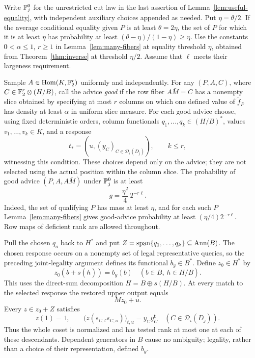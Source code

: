 Write $\mathbb P_j^0$ for the unrestricted cut law in the last assertion of
Lemma~\ref{lem:useful-equality}, with independent auxiliary choices appended
as needed.  Put $\eta=\theta/2$.  If the average conditional equality given $P$
is at least $\theta=2\eta$, the set of $P$ for which it is at least
$\eta$ has probability at least $(\theta-\eta)/(1-\eta)\ge\eta$.  Use the constants
$0<\alpha\le1$, $r\ge1$ in Lemma~\ref{lem:many-fibers} at equality threshold
$\eta$, obtained from Theorem~\ref{thm:inverse} at threshold $\eta/2$.
Assume that $\ell$ meets their largeness requirement.

Sample $A\in\operatorname{Hom}(K,\mathbb F_2^r)$ uniformly and independently.  For any
$(P,A,C)$, where $C\in\mathbb F_2^r\otimes(H/B)$, call the advice \emph{good} if
the row fiber $A\bar M=C$ has a nonempty slice obtained by specifying at
most $r$ columns on which one defined value of $\widetilde f_P$ has density
at least $\alpha$ in uniform slice measure.  For each good advice choose,
using fixed deterministic orders, column functionals
$q_1,\ldots,q_k\in(H/B)^*$, values $v_1,\ldots,v_k\in K$, and a response
\[
 t_*=(u,(y_C)_{C\in\mathcal D_i(D_j)}),\qquad k\le r,
\]
witnessing this condition.  These choices depend only on the advice; they
are not selected using the actual position within the column slice.
The probability of good advice $(P,A,A\bar M)$ under $\mathbb P_j^0$ is at least
\begin{equation}\label{eq:upper-g}
 g=\frac{\eta^2}{4}\,2^{-r\ell}.
\end{equation}
Indeed, the set of qualifying $P$ has mass at least $\eta$, and for each
such $P$ Lemma~\ref{lem:many-fibers} gives good-advice probability at least
$(\eta/4)2^{-r\ell}$.  Row maps of deficient rank are allowed throughout.

Pull the chosen $q_a$ back to $H^*$ and put
$Z=\operatorname{span}\{q_1,\ldots,q_k\}\subseteq\operatorname{Ann}(B)$.  The chosen response occurs
on a nonempty set of legal representative queries, so the preceding
joint-legality argument defines its functional $b_y\in B^*$.
Define $z_0\in H^*$ by
\begin{equation}\label{eq:upper-z0}
 z_0(b+s(\bar h))=b_y(b)
       \quad(b\in B,\ \bar h\in H/B).
\end{equation}
This uses the direct-sum decomposition $H=B\oplus s(H/B)$.  At every match
to the selected response the restored upper output equals
\begin{equation}\label{eq:upper-restored}
 Mz_0+u.
\end{equation}
Every $z\in z_0+Z$ satisfies
\begin{equation}\label{eq:upper-valid}
 z(1)=1,\qquad
 \bigl(z(s_{C,t}s_{C,u})\bigr)_{t,u}
       =y_Cy_C^{\mathsf t}\quad(C\in\mathcal D_i(D_j)).
\end{equation}
Thus the whole coset is normalized and has tested rank at most one at
each of these descendants.  Dependent generators in $B$ cause no ambiguity;
legality, rather than a choice of their representation, defined $b_y$.

